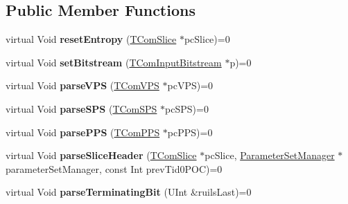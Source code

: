 \subsection*{Public Member Functions}
\begin{DoxyCompactItemize}
\item 
\mbox{\label{class_t_dec_entropy_if_a3a6f0668dc7867e89353cc74ad04f269}} 
virtual Void {\bfseries reset\+Entropy} (\hyperlink{class_t_com_slice}{T\+Com\+Slice} $\ast$pc\+Slice)=0
\item 
\mbox{\label{class_t_dec_entropy_if_a20ecbdd90e6bc31de4f50f94d5ee3a69}} 
virtual Void {\bfseries set\+Bitstream} (\hyperlink{class_t_com_input_bitstream}{T\+Com\+Input\+Bitstream} $\ast$p)=0
\item 
\mbox{\label{class_t_dec_entropy_if_af11a0843a2c29c502052c28c58b1b391}} 
virtual Void {\bfseries parse\+V\+PS} (\hyperlink{class_t_com_v_p_s}{T\+Com\+V\+PS} $\ast$pc\+V\+PS)=0
\item 
\mbox{\label{class_t_dec_entropy_if_ae3ca46014deb8f58051f745cdcc740e2}} 
virtual Void {\bfseries parse\+S\+PS} (\hyperlink{class_t_com_s_p_s}{T\+Com\+S\+PS} $\ast$pc\+S\+PS)=0
\item 
\mbox{\label{class_t_dec_entropy_if_a6c1221dabdfcdfccf728fbfb6dc36419}} 
virtual Void {\bfseries parse\+P\+PS} (\hyperlink{class_t_com_p_p_s}{T\+Com\+P\+PS} $\ast$pc\+P\+PS)=0
\item 
\mbox{\label{class_t_dec_entropy_if_a2b8932a6b914bf2266ad9713a3afbc56}} 
virtual Void {\bfseries parse\+Slice\+Header} (\hyperlink{class_t_com_slice}{T\+Com\+Slice} $\ast$pc\+Slice, \hyperlink{class_parameter_set_manager}{Parameter\+Set\+Manager} $\ast$parameter\+Set\+Manager, const Int prev\+Tid0\+P\+OC)=0
\item 
\mbox{\label{class_t_dec_entropy_if_a590b843028c2a5445b0224e923dd115e}} 
virtual Void {\bfseries parse\+Terminating\+Bit} (U\+Int \&ruils\+Last)=0
\item 
\mbox{\label{class_t_dec_entropy_if_a8e1a4bd9cc7593c476f918998e817962}} 

\end{DoxyCompactItemize}
